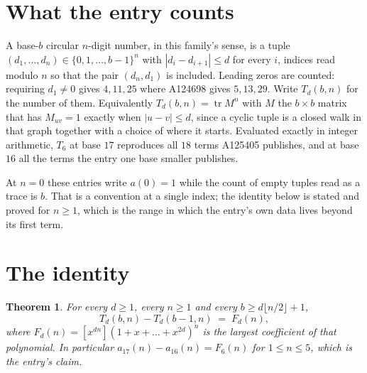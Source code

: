 \documentclass[11pt,a4paper]{article}
\theoremstyle{plain}
\newtheorem{theorem}{Theorem}
\theoremstyle{definition}
\begin{document}
\section{What the entry counts}

A base-$b$ circular $n$-digit number, in this family's sense, is a tuple
$(d_1,\dots,d_n)\in\{0,1,\dots,b-1\}^{n}$ with $|d_i-d_{i+1}|\le d$ for every $i$, indices
read modulo $n$ so that the pair $(d_n,d_1)$ is included. Leading zeros are counted: requiring
$d_1\ne0$ gives $4,11,25$ where A124698 gives $5,13,29$. Write $T_d(b,n)$ for the number of
them. Equivalently $T_d(b,n)=\operatorname{tr}M^{n}$ with $M$ the $b\times b$ matrix that has
$M_{uv}=1$ exactly when $|u-v|\le d$, since a cyclic tuple is a closed walk in that graph
together with a choice of where it starts. Evaluated exactly in integer arithmetic, $T_{6}$
at base $17$ reproduces all $18$ terms A125405 publishes, and at base $16$ all the
terms the entry one base smaller publishes.

At $n=0$ these entries write $a(0)=1$ while the count of empty tuples read as a trace is $b$.
That is a convention at a single index; the identity below is stated and proved for $n\ge1$,
which is the range in which the entry's own data lives beyond its first term.

\section{The identity}

\begin{theorem}
For every $d\ge1$, every $n\ge1$ and every $b\ge d\lfloor n/2\rfloor+1$,
\[
T_d(b,n)-T_d(b-1,n)\;=\;F_d(n),
\]
where $F_d(n)=[x^{dn}](1+x+\dots+x^{2d})^{n}$ is the largest coefficient of that
polynomial. In particular $a_{17}(n)-a_{16}(n)=F_{6}(n)$ for $1\le n\le5$, which
is the entry's claim.
\end{theorem}
\end{document}
